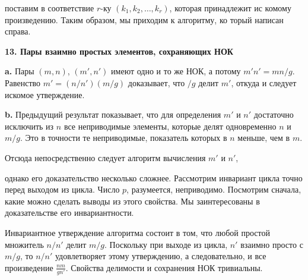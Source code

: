 \documentclass{mai_book}
\begin{document}
\newpage


\noindent поставим в соответствие $r$-ку $(k_1,k_2,\dots,k_r)$, которая принадлежит ис­
комому произведению. Таким образом, мы приходим к алгоритму, ко­
торый написан справа.

\bigskip
\textbf{13. Пары взаимно простых элементов, сохраняющих НОК}

\medskip
\textbf{a.} Пары $(m,n)$, $(m',n')$ имеют одно и то же НОК, а потому
$m'n'=mn/g$. Равенство $m'=(n/n')(m/g)$ доказывает, что $/g$ делит
$m'$, откуда и следует искомое утверждение.

\smallskip
\textbf{b.} Предыдущий результат показывает, что для определения $m'$ и $n'$
достаточно исключить из $n$ все неприводимые элементы, которые делят
одновременно $n$ и $m/g$. Это в точности те неприводимые, показатель
которых в $n$ меньше, чем в $m$.

Отсюда непосредственно следует алгоритм вычисления $m'$ и $n'$,
однако его доказательство не­сколько сложнее. Рассмотрим ин­вариант цикла точно перед выхо­дом из цикла. Число $p$, разумеется, неприводимо. Посмотрим сначала, какие можно сделать выводы из этого свойства. Мы заинтересованы в доказательстве его инвариантности.

Инвариантное утверждение алгоритма состоит в том, что любой
простой множитель $n/n'$ делит $m/g$. Поскольку при выходе из цикла, $n'$
взаимно просто с $m/g$, то $n/n'$ удовлетворяет этому утверждению, а
следовательно, и все произведение $\frac{nm}{gn'}$. Свойства делимости и сохране­ния НОК тривиальны.
\end{document}
